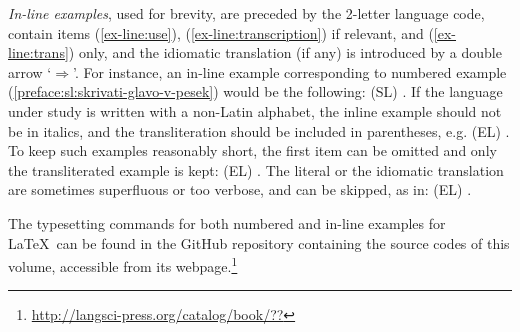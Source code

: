 \documentclass[output=paper,
modfonts,
]{langscibook}
\begin{document}



\emph{In-line examples}, used for brevity, are preceded by the 2-letter language code, contain items (\ref{ex-line:use}), (\ref{ex-line:transcription}) if relevant, and (\ref{ex-line:trans}) only, and the idiomatic translation (if any) is introduced by a double arrow `$\Rightarrow$'. For instance, an in-line example corresponding to numbered example (\ref{preface:sl:skrivati-glavo-v-pesek}) would be the following: (SL) . 
%
If the language under study is written with a non-Latin alphabet, the inline example should not be in italics, and the transliteration should be included in parentheses, e.g. (EL) . To keep such examples reasonably short, the first item can be omitted and only the transliterated example is kept: (EL) . 
%
The literal or the idiomatic translation are sometimes superfluous or too verbose, and can be skipped, as in:  (EL) . 

The typesetting commands for both numbered and in-line examples for \LaTeX~can be found in the GitHub repository containing the source codes of this volume, accessible from its webpage.\footnote{\url{http://langsci-press.org/catalog/book/??}} %


\end{document}
